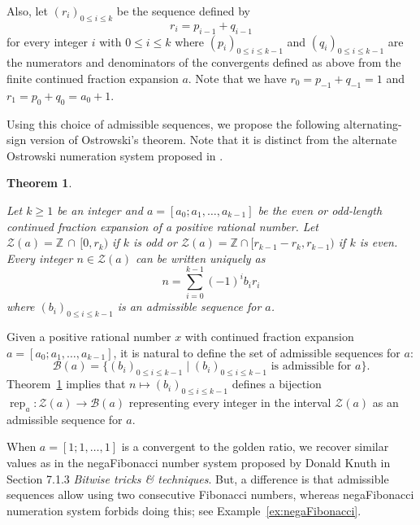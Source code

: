 \documentclass[a4paper,12pt]{amsart}
\newtheorem{maintheorem}{Theorem}
\newcommand{\Z}{\mathbb{Z}}
\newcommand{\xx}{{x}}
\newcommand{\Bcal}{{\mathcal{B}}}
\newcommand{\Zcal}{{\mathcal{Z}}}
\newcommand{\0}{\mathtt{0}}
\newcommand{\1}{\mathtt{1}}
\newcommand{\2}{\mathtt{2}}
\newcommand{\3}{\mathtt{3}}
\DeclareMathOperator{\rep}{rep}
\begin{document}
Also, let $(r_i)_{0\leq i\leq k}$ be the sequence defined by
\[
    r_i=p_{i-1}+q_{i-1}
\]
for every integer $i$ with $0\leq i\leq k$
where $(p_i)_{0\leq i\leq k-1}$ and $(q_i)_{0\leq i\leq k-1}$
are the numerators and denominators of the convergents
defined as above from the finite continued fraction expansion $a$.
Note that we have $r_0=p_{-1}+q_{-1}=1$ and $r_1=p_0+q_0=a_0+1$.


\newcommand\MainTheoremA{
    Let $k\geq1$ be an integer and
    $a=[a_0; a_1, \dots, a_{k-1}]$ be the even or odd-length continued
    fraction expansion of a positive rational number.
    Let $\Zcal(a)=\Z\,\cap\,[0,r_{k})$ if $k$ is odd
    or $\Zcal(a)=\Z\cap[r_{k-1}-r_{k},r_{k-1})$ if $k$ is even.
    Every integer $n\in \Zcal(a)$ can be written uniquely as
    \[
        n = \sum_{i=0}^{k-1}(-1)^ib_{i}r_{i}
    \]
    where  $(b_i)_{0\leq i\leq k-1}$ is an admissible sequence for $a$.
}

    Using this choice of admissible sequences, we propose the following
    alternating-sign version of Ostrowski's theorem.
    Note that it is distinct from the alternate Ostrowski numeration
    system proposed in \cite{bourla_ostrowski_2016}.

\begin{maintheorem}\label{thm:our-ostrowski-in-introduction}
    \MainTheoremA
\end{maintheorem}

Given a positive rational number $\xx$ with continued fraction
expansion $a=[a_0; a_1, \dots, a_{k-1}]$, it is natural to define
the set of admissible sequences for $a$:
\[
        \Bcal(a)
        =
        \{(b_i)_{0\leq i\leq k-1} \mid
            (b_i)_{0\leq i\leq k-1}
            \text{ is admissible for } a
        \}.
\]
Theorem~\ref{thm:our-ostrowski-in-introduction}
implies that $n\mapsto(b_i)_{0\leq i\leq k-1}$
defines a bijection $\rep_a:\Zcal(a)\to\Bcal(a)$
representing every integer in the interval $\Zcal(a)$ as an admissible sequence for
$a$.

When $a=[1;1,\dots,1]$ is a convergent to the golden ratio,
we recover similar values %
as in the negaFibonacci number system proposed by Donald Knuth
\cite{zbMATH05597000} in Section
7.1.3 \textit{Bitwise tricks \& techniques}.
But, a difference is that admissible sequences allow using two consecutive
Fibonacci numbers, whereas negaFibonacci numeration system forbids doing this;
see Example~\ref{ex:negaFibonacci}.
\end{document}
